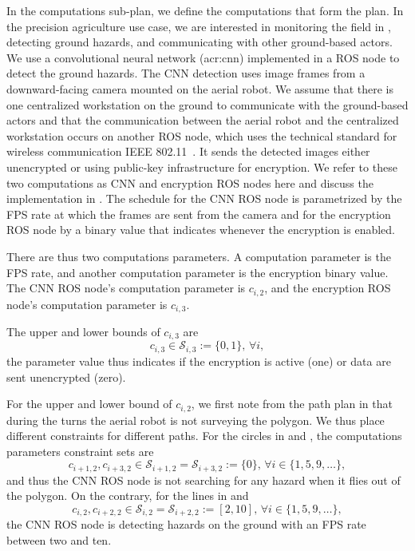 In the computations sub-plan, we define the computations that form the plan. In the precision agriculture use case, we are interested in monitoring the field in , detecting ground hazards, and communicating with other ground-based actors. We use a convolutional neural network (\Gls{acr:cnn}) implemented in a ROS node to detect the ground hazards. The CNN detection uses image frames from a downward-facing camera mounted on the aerial robot. We assume that there is one centralized workstation on the ground to communicate with the ground-based actors and that the communication between the aerial robot and the centralized workstation occurs on another ROS node, which uses the technical standard for wireless communication IEEE 802.11~\citep{crow1997ieee}. It sends the detected images either unencrypted or using public-key infrastructure for encryption. We refer to these two computations as CNN and encryption ROS nodes here and discuss the implementation in . The schedule for the CNN ROS node is parametrized by the FPS rate at which the frames are sent from the camera and for the encryption ROS node by a binary value that indicates whenever the encryption is enabled.

There are thus two computations parameters. A computation parameter is the FPS rate, and another computation parameter is the encryption binary value. The CNN ROS node's computation parameter is $c_{i,2}$, and the encryption ROS node's computation parameter is $c_{i,3}$.

The upper and lower bounds of $c_{i,3}$ are 
\begin{equation}\label{eq:encr-comp-const}
  c_{i,3}\in\mathcal{S}_{i,3}:=\{0,1\},\,\forall i,
\end{equation}
the parameter value thus indicates if the encryption is active (one) or data are sent unencrypted (zero).

For the upper and lower bound of $c_{i,2}$, we first note from the path plan in  that during the turns the aerial robot is not surveying the polygon. We thus place different constraints for different paths. For the circles in  and , the computations parameters constraint sets are 
\begin{equation}
  c_{i+1,2},c_{i+3,2}\in\mathcal{S}_{i+1,2}=\mathcal{S}_{i+3,2}:=\{0\},\,\forall i\in\{1,5,9,\dots\},
\end{equation}
and thus the CNN ROS node is not searching for any hazard when it flies out of the polygon. On the contrary, for the lines in  and  
\begin{equation}\label{eq:cnn-comp-const}
c_{i,2},c_{i+2,2}\in\mathcal{S}_{i,2}=\mathcal{S}_{i+2,2}:=[2,10],\,\forall i\in\{1,5,9,\dots\},
\end{equation} 
the CNN ROS node is detecting hazards on the ground with an FPS rate between two and ten.


